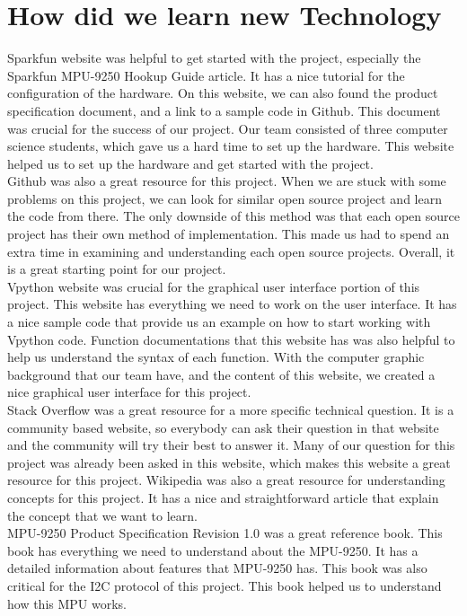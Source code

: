 \newpage
\section{How did we learn new Technology}
Sparkfun website was helpful to get started with the project, especially the Sparkfun MPU-9250 Hookup Guide article. It has a nice tutorial for the configuration of the hardware. On this website, we can also found the product specification document, and a link to a sample code in Github. This document was crucial for the success of our project. Our team consisted of three computer science students, which gave us a hard time to set up the hardware. This website helped us to set up the hardware and get started with the project. \\

Github was also a great resource for this project. When we are stuck with some problems on this project, we can look for similar open source project and learn the code from there. The only downside of this method was that each open source project has their own method of implementation. This made us had to spend an extra time in examining and understanding each open source projects. Overall, it is a great starting point for our project. \\

Vpython website was crucial for the graphical user interface portion of this project. This website has everything we need to work on the user interface. It has a nice sample code that provide us an example on how to start working with Vpython code. Function documentations that this website has was also helpful to help us understand the syntax of each function. With the computer graphic background that our team have, and the content of this website, we created a nice graphical user interface for this project. \\

Stack Overflow was a great resource for a more specific technical question. It is a community based website, so everybody can ask their question in that website and the community will try their best to answer it. Many of our question for this project was already been asked in this website, which makes this website a great resource for this project. Wikipedia was also a great resource for understanding concepts for this project. It has a nice and straightforward article that explain the concept that we want to learn. \\

MPU-9250 Product Specification Revision 1.0 was a great reference book. This book has everything we need to understand about the MPU-9250. It has a detailed information about features that MPU-9250 has. This book was also critical for the I2C protocol of this project. This book helped us to understand how this MPU works. \\

